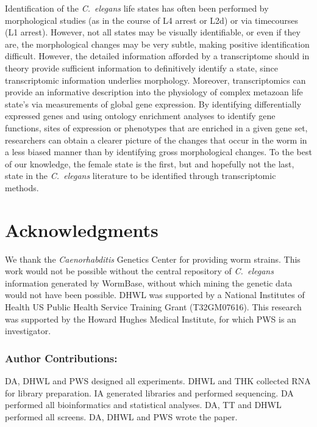 \documentclass[10pt,letterpaper,twocolumn]{article}
\newcommand{\cel}{\emph{C.~elegans}}
\begin{document}
Identification of the \cel{} life states has often been performed by morphological studies (as in the course of L4 arrest or L2d) or via timecourses (L1 arrest). However, not all states may be visually identifiable, or even if they are, the morphological changes may be very subtle, making positive identification difficult. However, the detailed information afforded by a transcriptome should in theory provide sufficient information to definitively identify a state, since transcriptomic information underlies morphology.
Moreover, transcriptomics can provide an informative description into the physiology of complex metazoan life state's via measurements of global gene expression. By identifying differentially expressed genes and using ontology enrichment analyses to identify gene functions, sites of expression or phenotypes that are enriched in a given gene set, researchers can obtain a clearer picture of the changes that occur in the worm in a less biased manner than by identifying gross morphological changes.
To the best of our knowledge, the female state is the first, but and hopefully not the last, state in the \cel{} literature to be identified through transcriptomic methods.

\section*{Acknowledgments}

We thank the \emph{Caenorhabditis} Genetics Center for providing worm strains. This work would not be possible without the central repository of \cel{} information generated by WormBase, without which mining the genetic data would not have been possible. DHWL was supported by a National Institutes of Health US Public Health Service Training Grant (T32GM07616). This research was supported by the Howard Hughes Medical Institute, for which PWS is an investigator.

\subsubsection*{Author Contributions:}
DA, DHWL and PWS designed all experiments. DHWL and THK collected RNA for library preparation. IA generated libraries and performed sequencing. DA performed all bioinformatics and statistical analyses. DA, TT and DHWL performed all screens. DA, DHWL and PWS wrote the paper.

\nolinenumbers{}




\end{document}
